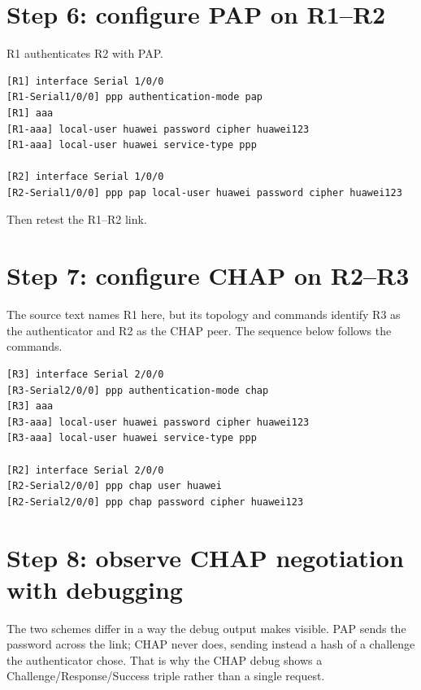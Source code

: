 \section{Step 6: configure PAP on R1--R2}
R1 authenticates R2 with PAP.
\begin{lstlisting}[style=utpterminal]
[R1] interface Serial 1/0/0
[R1-Serial1/0/0] ppp authentication-mode pap
[R1] aaa
[R1-aaa] local-user huawei password cipher huawei123
[R1-aaa] local-user huawei service-type ppp

[R2] interface Serial 1/0/0
[R2-Serial1/0/0] ppp pap local-user huawei password cipher huawei123
\end{lstlisting}
Then retest the R1--R2 link.

\section{Step 7: configure CHAP on R2--R3}
The source text names R1 here, but its topology and commands identify R3 as the authenticator and R2 as the CHAP peer. The sequence below follows the commands.

\begin{lstlisting}[style=utpterminal]
[R3] interface Serial 2/0/0
[R3-Serial2/0/0] ppp authentication-mode chap
[R3] aaa
[R3-aaa] local-user huawei password cipher huawei123
[R3-aaa] local-user huawei service-type ppp

[R2] interface Serial 2/0/0
[R2-Serial2/0/0] ppp chap user huawei
[R2-Serial2/0/0] ppp chap password cipher huawei123
\end{lstlisting}

\section{Step 8: observe CHAP negotiation with debugging}

The two schemes differ in a way the debug output makes visible. PAP
sends the password across the link; CHAP never does, sending instead a
hash of a challenge the authenticator chose. That is why the CHAP debug
shows a Challenge/Response/Success triple rather than a single request.

